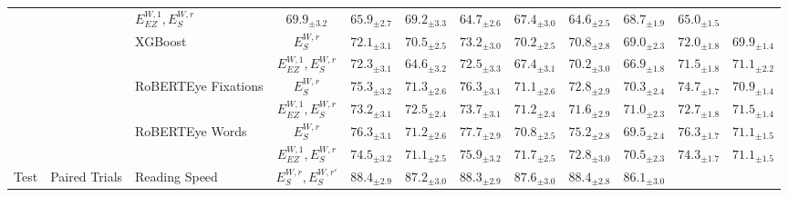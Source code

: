 \begin{table*}[ht]
{\begin{tabular}{lllc*{4}{cc}}
          & 
              & $E_{EZ}^{W,1},E_S^{W,r}$ 
              & $69.9_{\pm3.2}$ & $65.9_{\pm2.7}$ 
              & $69.2_{\pm3.3}$ & $64.7_{\pm2.6}$ 
              & $67.4_{\pm3.0}$ & $64.6_{\pm2.5}$ 
              & $68.7_{\pm1.9}$ & $65.0_{\pm1.5}$ \\ \cmidrule{3-12}
      & 
          & \multirow{2}{*}{XGBoost}  
              & $E_S^{W,r}$ 
              & $72.1_{\pm3.1}$ & $70.5_{\pm2.5}$ 
              & $73.2_{\pm3.0}$ & $70.2_{\pm2.5}$ 
              & $70.8_{\pm2.8}$ & $69.0_{\pm2.3}$ 
              & $72.0_{\pm1.8}$ & $69.9_{\pm1.4}$ \\[1ex]
      & 
          & 
              & $E_{EZ}^{W,1},E_S^{W,r}$ 
              & $72.3_{\pm3.1}$ & $64.6_{\pm3.2}$ 
              & $72.5_{\pm3.3}$ & $67.4_{\pm3.1}$ 
              & $70.2_{\pm3.0}$ & $66.9_{\pm1.8}$ 
              & $71.5_{\pm1.8}$ & $71.1_{\pm2.2}$ \\ \cmidrule{3-12}
      & 
          & \multirow{2}{*}{RoBERTEye Fixations}   
              & $E_S^{W,r}$ 
              & $75.3_{\pm3.2}$ & $71.3_{\pm2.6}$ 
              & $76.3_{\pm3.1}$ & $71.1_{\pm2.6}$ 
              & $72.8_{\pm2.9}$ & $70.3_{\pm2.4}$ 
              & $74.7_{\pm1.7}$ & $70.9_{\pm1.4}$ \\[1ex]
      & 
          & 
              & $E_{EZ}^{W,1},E_S^{W,r}$ 
              & $73.2_{\pm3.1}$ & $72.5_{\pm2.4}$ 
              & $73.7_{\pm3.1}$ & $71.2_{\pm2.4}$ 
              & $71.6_{\pm2.9}$ & $71.0_{\pm2.3}$ 
              & $72.7_{\pm1.8}$ & $71.5_{\pm1.4}$ \\ \cmidrule{3-12}
      & 
          & \multirow{2}{*}{RoBERTEye Words} 
              & $E_S^{W,r}$ 
              & $76.3_{\pm3.1}$ & $71.2_{\pm2.6}$ 
              & $77.7_{\pm2.9}$ & $70.8_{\pm2.5}$ 
              & $75.2_{\pm2.8}$ & $69.5_{\pm2.4}$ 
              & $76.3_{\pm1.7}$ & $71.1_{\pm1.5}$ \\[1ex]
      & 
          &  
              & $E_{EZ}^{W,1},E_S^{W,r}$ 
              & $74.5_{\pm3.2}$ & $71.1_{\pm2.5}$ 
              & $75.9_{\pm3.2}$ & $71.7_{\pm2.5}$ 
              & $72.8_{\pm3.0}$ & $70.5_{\pm2.3}$ 
              & $74.3_{\pm1.7}$ & $71.1_{\pm1.5}$ \\
    \midrule
    \multirow{12}{*}{Test} 
      & \multirow{4}{*}{Paired Trials} 
          & Reading Speed 
              & $E_S^{W,r},E_S^{W,r'}$ 
              & $88.4_{\pm2.9}$ & $87.2_{\pm3.0}$ 
              & $88.3_{\pm2.9}$ & $87.6_{\pm3.0}$ 
              & $88.4_{\pm2.8}$ & $86.1_{\pm3.0}$ 

\end{tabular}}
\end{table*}
